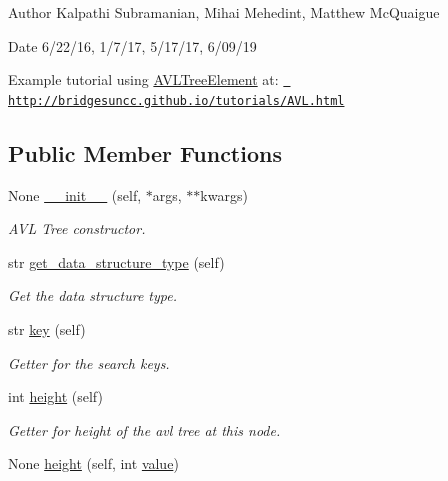 \begin{DoxyAuthor}{Author}
Kalpathi Subramanian, Mihai Mehedint, Matthew Mc\+Quaigue
\end{DoxyAuthor}
\begin{DoxyDate}{Date}
6/22/16, 1/7/17, 5/17/17, 6/09/19
\end{DoxyDate}
Example tutorial using \mbox{\hyperlink{classbridges_1_1avl__tree__element_1_1_a_v_l_tree_element}{A\+V\+L\+Tree\+Element}} at\+: \href{http://bridgesuncc.github.io/tutorials/AVL.html}{\texttt{ http\+://bridgesuncc.\+github.\+io/tutorials/\+A\+V\+L.\+html}} \subsection*{Public Member Functions}
\begin{DoxyCompactItemize}
\item 
None \mbox{\hyperlink{classbridges_1_1avl__tree__element_1_1_a_v_l_tree_element_a5c07b41b6a37b9392b3ecea517d2d0ea}{\+\_\+\+\_\+init\+\_\+\+\_\+}} (self, $\ast$args, $\ast$$\ast$kwargs)
\begin{DoxyCompactList}\small\item\em A\+VL Tree constructor. \end{DoxyCompactList}\item 
str \mbox{\hyperlink{classbridges_1_1avl__tree__element_1_1_a_v_l_tree_element_a811dd4cebd36fda6531f6cbeb873c0e5}{get\+\_\+data\+\_\+structure\+\_\+type}} (self)
\begin{DoxyCompactList}\small\item\em Get the data structure type. \end{DoxyCompactList}\item 
str \mbox{\hyperlink{classbridges_1_1avl__tree__element_1_1_a_v_l_tree_element_ac830bbf88d156574fd23a8b1eaa6bc69}{key}} (self)
\begin{DoxyCompactList}\small\item\em Getter for the search keys. \end{DoxyCompactList}\item 
int \mbox{\hyperlink{classbridges_1_1avl__tree__element_1_1_a_v_l_tree_element_af32b7f1985abf0f6c0573cc23fef63b6}{height}} (self)
\begin{DoxyCompactList}\small\item\em Getter for height of the avl tree at this node. \end{DoxyCompactList}\item 
None \mbox{\hyperlink{classbridges_1_1avl__tree__element_1_1_a_v_l_tree_element_acc82ab37af6763d759493fd708218702}{height}} (self, int \mbox{\hyperlink{classbridges_1_1element_1_1_element_ad18e8738e025d7af322144aecbec1629}{value}})
$$
\end{DoxyCompactItemize}
